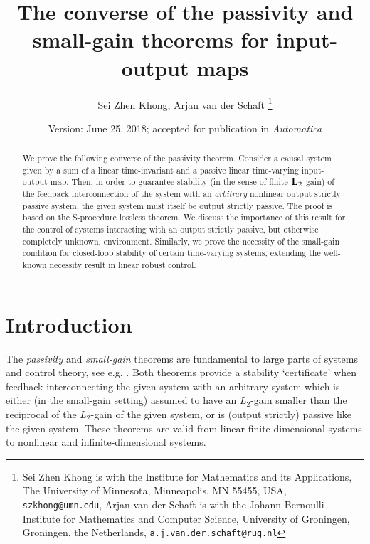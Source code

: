 \documentclass[11pt]{article}
\title{The converse of the passivity and small-gain theorems for input-output maps}
\author{Sei Zhen Khong, Arjan van der Schaft
\thanks{Sei Zhen Khong is with the Institute for Mathematics and its Applications, The University of Minnesota, Minneapolis, MN 55455, USA, {\tt\small szkhong@umn.edu}, 
Arjan van der Schaft is with the Johann Bernoulli Institute for Mathematics and Computer Science, University of Groningen, Groningen, the Netherlands, {\tt\small a.j.van.der.schaft@rug.nl}}
}
\date{Version: June 25, 2018; accepted for publication in {\it Automatica}}
\newcommand{\Ltwo}{\boldsymbol{\rm L}_{2}}
\begin{document}
\maketitle
\thispagestyle{empty}
\pagestyle{empty}
\begin{abstract}
  We prove the following converse of the passivity theorem. Consider a causal system given by a sum of a linear time-invariant and a passive linear
  time-varying input-output map. Then, in order to guarantee stability (in the sense of finite $\Ltwo$-gain) of the feedback interconnection of the
  system with an {\it arbitrary} nonlinear output strictly passive system, the given system must itself be output strictly passive. The proof is based
  on the S-procedure lossless theorem. We discuss the importance of this result for the control of systems interacting with an output strictly
  passive, but otherwise completely unknown, environment. Similarly, we prove the necessity of the small-gain condition for closed-loop stability of certain
  time-varying systems, extending the well-known necessity result in linear robust control.
\end{abstract}



\section{Introduction}
The {\it passivity} and {\it small-gain} theorems are fundamental to large parts of systems and control theory, see
e.g. \cite{Wil72, MoyHil78, Vid81, MegRan97, Sch17}. Both theorems provide a stability `certificate' when feedback interconnecting the given system with an arbitrary system which is either (in the small-gain setting) assumed to have an $L_2$-gain smaller than the reciprocal of the $L_2$-gain of the given system, or is (output strictly) passive like the given system. These theorems are valid from linear finite-dimensional systems to nonlinear and infinite-dimensional systems.
\end{document}
